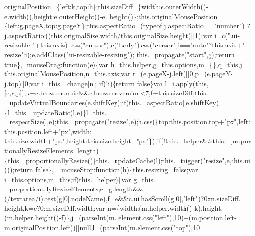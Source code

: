 \begin{DoxyCode}
      originalPosition=\{left:k,top:h\};this.sizeDiff=\{width:e.outerWidth()-e.width(),height:e.outerHeight()-e.
      height()\};this.originalMousePosition=\{left:g.pageX,top:g.pageY\};this.aspectRatio=(typeof j.aspectRatio==\textcolor{stringliteral}{"number"})
      ?j.aspectRatio:((\textcolor{keyword}{this}.originalSize.width/\textcolor{keyword}{this}.originalSize.height)||1);var i=c(\textcolor{stringliteral}{".ui-resizable-"}+this.axis).
      css(\textcolor{stringliteral}{"cursor"});c(\textcolor{stringliteral}{"body"}).css(\textcolor{stringliteral}{"cursor"},i==\textcolor{stringliteral}{"auto"}?this.axis+\textcolor{stringliteral}{"-resize"}:i);e.addClass(\textcolor{stringliteral}{"ui-resizable-resizing"});
      this.\_propagate(\textcolor{stringliteral}{"start"},g);\textcolor{keywordflow}{return} \textcolor{keyword}{true}\},\_mouseDrag:\textcolor{keyword}{function}(e)\{var h=this.helper,g=this.options,m=\{\},q=\textcolor{keyword}{this},j=
      this.originalMousePosition,n=this.axis;var r=(e.pageX-j.left)||0,p=(e.pageY-j.top)||0;var i=this.\_change[n];\textcolor{keywordflow}{
      if}(!i)\{\textcolor{keywordflow}{return} \textcolor{keyword}{false}\}var l=i.apply(\textcolor{keyword}{this},[e,r,p]),k=c.browser.msie&&c.browser.version<7,f=this.sizeDiff;this.
      \_updateVirtualBoundaries(e.shiftKey);\textcolor{keywordflow}{if}(this.\_aspectRatio||e.shiftKey)\{l=this.\_updateRatio(l,e)\}l=this.
      \_respectSize(l,e);this.\_propagate(\textcolor{stringliteral}{"resize"},e);h.css(\{top:this.position.top+\textcolor{stringliteral}{"px"},left:this.position.left+\textcolor{stringliteral}{"px"},width:
      this.size.width+\textcolor{stringliteral}{"px"},height:this.size.height+\textcolor{stringliteral}{"px"}\});\textcolor{keywordflow}{if}(!this.\_helper&&this.\_proportionallyResizeElements.
      length)\{this.\_proportionallyResize()\}this.\_updateCache(l);this.\_trigger(\textcolor{stringliteral}{"resize"},e,this.ui());\textcolor{keywordflow}{return} \textcolor{keyword}{false}\},
      \_mouseStop:\textcolor{keyword}{function}(h)\{this.resizing=\textcolor{keyword}{false};var i=this.options,m=\textcolor{keyword}{this};\textcolor{keywordflow}{if}(this.\_helper)\{var g=this.
      \_proportionallyResizeElements,e=g.length&&(/textarea/i).test(g[0].nodeName),f=e&&c.ui.hasScroll(g[0],\textcolor{stringliteral}{"left"})?0:m.sizeDiff.
      height,k=e?0:m.sizeDiff.width;var n=\{width:(m.helper.width()-k),height:(m.helper.height()-f)\},j=(parseInt(m.
      element.css(\textcolor{stringliteral}{"left"}),10)+(m.position.left-m.originalPosition.left))||null,l=(parseInt(m.element.css(\textcolor{stringliteral}{"top"}),10

\end{DoxyCode}
